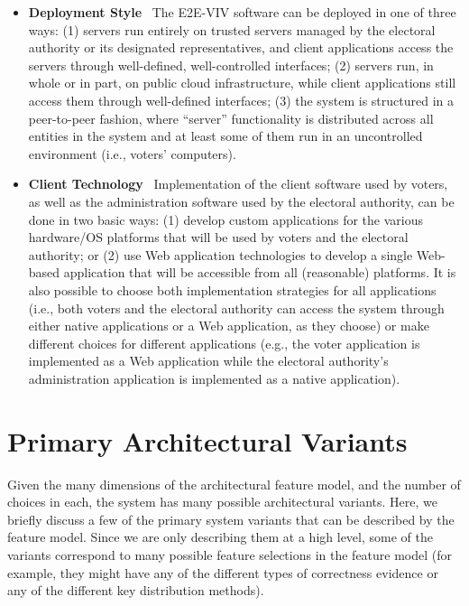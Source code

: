 \begin{itemize}
\item \textbf{Deployment Style} \ The E2E-VIV software can be deployed
  in one of three ways: (1) servers run entirely on trusted servers
  managed by the electoral authority or its designated
  representatives, and client applications access the servers through
  well-defined, well-controlled interfaces; (2) servers run, in whole
  or in part, on public cloud infrastructure, while client applications
  still access them through well-defined interfaces; (3) the system is
  structured in a peer-to-peer fashion, where ``server'' functionality
  is distributed across all entities in the system and at least some
  of them run in an uncontrolled environment (i.e., voters'
  computers). 

\item \textbf{Client Technology} \ Implementation of the client
  software used by voters, as well as the administration software used
  by the electoral authority, can be done in two basic ways: (1)
  develop custom applications for the various hardware/OS platforms
  that will be used by voters and the electoral authority; or (2) use
  Web application technologies to develop a single Web-based
  application that will be accessible from all (reasonable)
  platforms. It is also possible to choose both implementation
  strategies for all applications (i.e., both voters and the electoral
  authority can access the system through either native applications
  or a Web application, as they choose) or make different choices for
  different applications (e.g., the voter application is implemented
  as a Web application while the electoral authority's administration
  application is implemented as a native application).

\end{itemize}

\section{Primary Architectural Variants}
\label{section:primary_architectural_variants}

Given the many dimensions of the architectural feature model, and the
number of choices in each, the system has many possible architectural
variants. Here, we briefly discuss a few of the primary system
variants that can be described by the feature model. Since we are only
describing them at a high level, some of the variants correspond to
many possible feature selections in the feature model (for example,
they might have any of the different types of correctness evidence or
any of the different key distribution methods).

